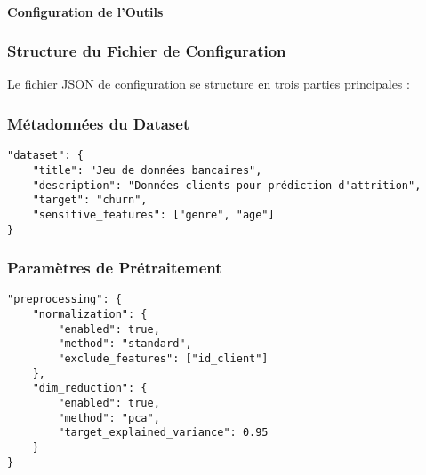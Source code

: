 

\paragraph*{Configuration de l'Outils}

\subsubsection{Structure du Fichier de Configuration}
Le fichier JSON de configuration se structure en trois parties principales :

\subsubsection{Métadonnées du Dataset}
\begin{verbatim}
"dataset": {
    "title": "Jeu de données bancaires",
    "description": "Données clients pour prédiction d'attrition",
    "target": "churn",
    "sensitive_features": ["genre", "age"]
}
\end{verbatim}

\subsubsection{Paramètres de Prétraitement}
\begin{verbatim}
"preprocessing": {
    "normalization": {
        "enabled": true,
        "method": "standard",
        "exclude_features": ["id_client"]
    },
    "dim_reduction": {
        "enabled": true,
        "method": "pca",
        "target_explained_variance": 0.95
    }
}
\end{verbatim}

